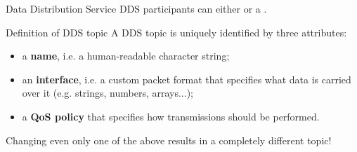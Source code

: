 \begin{frame}{Data Distribution Service}
	DDS participants can either  or  a .
	\begin{block}{Definition of DDS topic}
		A DDS topic is uniquely identified by three attributes:
		\begin{itemize}
			\item a \textbf{name}, i.e. a human-readable character string;
			\item an \textbf{interface}, i.e. a custom packet format that specifies what data is carried over it (e.g. strings, numbers, arrays...);
			\item a \textbf{QoS policy} that specifies how transmissions should be performed.
		\end{itemize}
	\end{block}
	\begin{block}{}
		\centering
		Changing even only one of the above results in a completely different topic!
	\end{block}
\end{frame}
